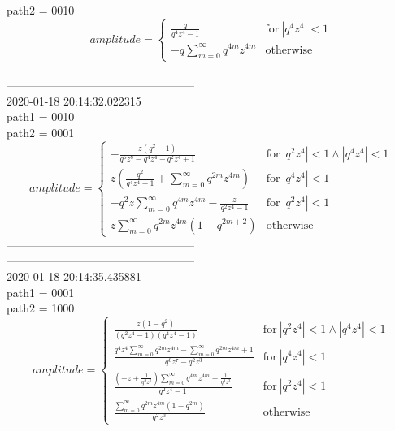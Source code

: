 path2 = 0010\\
$$amplitude = \begin{cases} \frac{q}{q^{4} z^{4} - 1} & \text{for}\: \left|{q^{4} z^{4}}\right| < 1 \\- q \sum_{m=0}^{\infty} q^{4 m} z^{4 m} & \text{otherwise} \end{cases}$$
--------------------------------------------------\\
--------------------------------------------------\\
2020-01-18 20:14:32.022315\\
path1 = 0010\\
path2 = 0001\\
$$amplitude = \begin{cases} - \frac{z \left(q^{2} - 1\right)}{q^{6} z^{8} - q^{4} z^{4} - q^{2} z^{4} + 1} & \text{for}\: \left|{q^{2} z^{4}}\right| < 1 \wedge \left|{q^{4} z^{4}}\right| < 1 \\z \left(\frac{q^{2}}{q^{4} z^{4} - 1} + \sum_{m=0}^{\infty} q^{2 m} z^{4 m}\right) & \text{for}\: \left|{q^{4} z^{4}}\right| < 1 \\- q^{2} z \sum_{m=0}^{\infty} q^{4 m} z^{4 m} - \frac{z}{q^{2} z^{4} - 1} & \text{for}\: \left|{q^{2} z^{4}}\right| < 1 \\z \sum_{m=0}^{\infty} q^{2 m} z^{4 m} \left(1 - q^{2 m + 2}\right) & \text{otherwise} \end{cases}$$
--------------------------------------------------\\
--------------------------------------------------\\
2020-01-18 20:14:35.435881\\
path1 = 0001\\
path2 = 1000\\
$$amplitude = \begin{cases} \frac{z \left(1 - q^{2}\right)}{\left(q^{2} z^{4} - 1\right) \left(q^{4} z^{4} - 1\right)} & \text{for}\: \left|{q^{2} z^{4}}\right| < 1 \wedge \left|{q^{4} z^{4}}\right| < 1 \\\frac{q^{4} z^{4} \sum_{m=0}^{\infty} q^{2 m} z^{4 m} - \sum_{m=0}^{\infty} q^{2 m} z^{4 m} + 1}{q^{6} z^{7} - q^{2} z^{3}} & \text{for}\: \left|{q^{4} z^{4}}\right| < 1 \\\frac{\left(- z + \frac{1}{q^{2} z^{3}}\right) \sum_{m=0}^{\infty} q^{4 m} z^{4 m} - \frac{1}{q^{2} z^{3}}}{q^{2} z^{4} - 1} & \text{for}\: \left|{q^{2} z^{4}}\right| < 1 \\\frac{\sum_{m=0}^{\infty} q^{2 m} z^{4 m} \left(1 - q^{2 m}\right)}{q^{2} z^{3}} & \text{otherwise} \end{cases}$$
